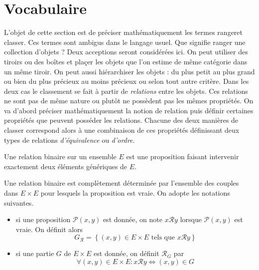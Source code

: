 

\section{Vocabulaire}
L'objet de cette section est de préciser mathématiquement les termes \og ranger\fg  et \og classer\fg. Ces termes sont ambigus dans le langage usuel. Que signifie ranger une collection d'objets ? Deux acceptions seront considérées ici. \newline
On peut utiliser des tiroirs ou des boîtes et plaçer les objets que l'on estime de même catégorie dans un même tiroir. On peut aussi hiérarchiser les objets : du plus petit au plus grand ou bien du plus précieux au moins précieux ou selon tout autre critère.\newline
 Dans les deux cas le classement se fait à partir de \emph{relations} entre les objets. Ces relations ne sont pas de même nature ou plutôt ne possèdent pas les mêmes propriétés. On va d'abord préciser mathématiquement la notion de relation puis définir certaines propriétés que peuvent posséder les relations. Chacune des deux manières de classer correspond alors à une combinaison de ces propriétés définissant deux types de relations \emph{d'équivalence} ou \emph{d'ordre}.
\begin{defi}
 Une relation binaire sur un ensemble $E$ est une proposition faisant intervenir exactement deux éléments génériques de $E$.
\end{defi}
Une relation binaire est complètement déterminée par l'ensemble des couples dans $E\times E$ pour lesquels la proposition est vraie.\newline
On adopte les notations suivantes.
\begin{itemize}
 \item si une proposition $\mathcal P(x,y)$ est donnée, on note $x\mathcal R y$ lorsque $\mathcal P(x,y)$ est vraie. On définit alors 
\begin{displaymath}
 G_\mathcal R = \left\lbrace (x,y)\in E\times E \text{ tels que } x\mathcal R y \right\rbrace 
\end{displaymath}
\item si une partie $G$ de $E \times E$ est donnée, on définit $\mathcal R_G$ par
\begin{displaymath}
 \forall (x,y)\in E\times E : x \mathcal R y \Leftrightarrow (x,y)\in G
\end{displaymath}
\end{itemize}

